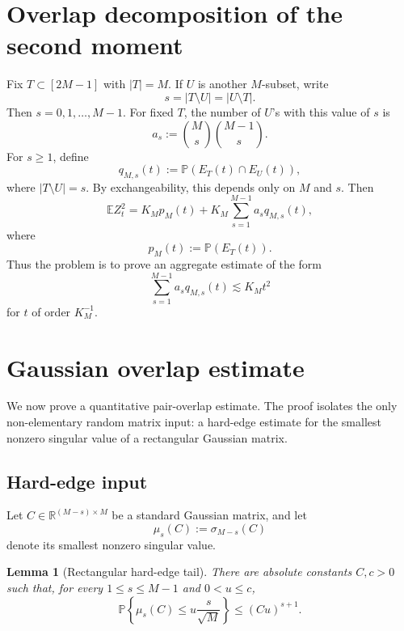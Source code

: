 \documentclass[11pt]{article}
\newtheorem{lemma}{Lemma}
\newcommand{\R}{\mathbb R}
\newcommand{\Pbb}{\mathbb P}
\newcommand{\Ebb}{\mathbb E}
\newcommand{\1}{\mathbf 1}
\begin{document}
\section{Overlap decomposition of the second moment}

Fix \(T\subset[2M-1]\) with \(|T|=M\).  If \(U\) is another \(M\)-subset, write
\[
        s=|T\setminus U|=|U\setminus T|.
\]
Then \(s=0,1,\dots,M-1\).  For fixed \(T\), the number of \(U\)'s with this value of
\(s\) is
\[
        a_s:=\binom Ms\binom{M-1}{s}.
\]
For \(s\ge1\), define
\[
        q_{M,s}(t)
        :=
        \Pbb(E_T(t)\cap E_U(t)),
\]
where \(|T\setminus U|=s\).  By exchangeability, this depends only on \(M\) and \(s\).
Then
\begin{equation}
        \Ebb Z_t^2
        =
        K_M p_M(t)
        +
        K_M\sum_{s=1}^{M-1}a_s q_{M,s}(t),
        \label{eq:second-moment-profile}
\end{equation}
where
\[
        p_M(t):=\Pbb(E_T(t)).
\]
Thus the problem is to prove an aggregate estimate of the form
\begin{equation}
        \sum_{s=1}^{M-1}a_s q_{M,s}(t)
        \lesssim
        K_M t^2
        \label{eq:aggregate-target}
\end{equation}
for \(t\) of order \(K_M^{-1}\).

\section{Gaussian overlap estimate}

We now prove a quantitative pair-overlap estimate.  The proof isolates the only
non-elementary random matrix input: a hard-edge estimate for the smallest nonzero
singular value of a rectangular Gaussian matrix.

\subsection{Hard-edge input}

Let \(C\in\R^{(M-s)\times M}\) be a standard Gaussian matrix, and let
\[
        \mu_s(C):=\sigma_{M-s}(C)
\]
denote its smallest nonzero singular value.

\begin{lemma}[Rectangular hard-edge tail]
There are absolute constants \(C,c>0\) such that, for every \(1\le s\le M-1\) and
\(0<u\le c\),
\begin{equation}
        \Pbb\left\{
        \mu_s(C)
        \le
        u\frac{s}{\sqrt M}
        \right\}
        \le
        (Cu)^{s+1}.
        \label{eq:rect-tail}
\end{equation}
\end{lemma}
\end{document}

